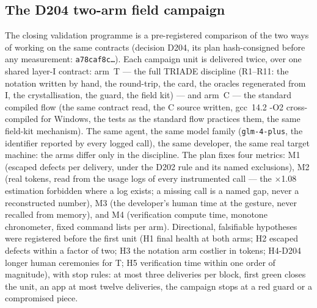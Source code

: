 \documentclass[11pt,a4paper]{article}
\newcommand{\code}[1]{\texttt{\small #1}}
\begin{document}


\subsection{The D204 two-arm field campaign}\label{sec:campagne}

The closing validation programme is a pre-registered comparison of the
two ways of working on the same contracts (decision D204, its plan
hash-consigned before any measurement: \code{a78caf8c\ldots}). Each
campaign unit is delivered twice, over one shared layer-I contract:
arm~T --- the full TRIADE discipline (R1--R11: the notation written by
hand, the round-trip, the card, the oracles regenerated from I, the
crystallisation, the guard, the field kit) --- and arm~C --- the
standard compiled flow (the same contract read, the C source written,
gcc~14.2 -O2 cross-compiled for Windows, the tests as the standard flow
practices them, the same field-kit mechanism). The same agent, the
same model family (\code{glm-4-plus}, the identifier reported by every
logged call), the same developer, the same real target machine: the
arms differ only in the discipline. The plan fixes four metrics:
M1 (escaped defects per delivery, under the D202 rule and its named
exclusions), M2 (real tokens, read from the usage logs of every
instrumented call --- the $\times$1.08 estimation forbidden where a log
exists; a missing call is a named gap, never a reconstructed number),
M3 (the developer's human time at the gesture, never recalled from
memory), and M4 (verification compute time, monotone chronometer,
fixed command lists per arm). Directional, falsifiable hypotheses were
registered before the first unit (H1 final health at both arms; H2
escaped defects within a factor of two; H3 the notation arm costlier in
tokens; H4-D204 longer human ceremonies for T; H5 verification time
within one order of magnitude), with stop rules: at most three
deliveries per block, first green closes the unit, an app at most
twelve deliveries, the campaign stops at a red guard or a compromised
piece.
\end{document}
